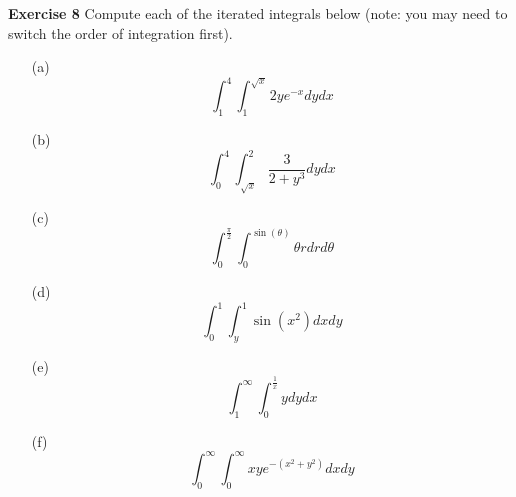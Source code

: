 \documentclass[12pt,oneside]{exam}
\newenvironment{exercise}[1]{\vspace{.1in}\noindent\textbf{Exercise #1 \hspace{.05em}}}{}
\begin{document}
\begin{exercise}{8}
Compute each of the iterated integrals below (note: you may need to switch the order of integration first). 
\begin{itemize}
\item[(a)] 
\begin{equation*}
\int_{1}^{4} \int_{1}^{\sqrt{x}} 2ye^{-x} dy dx
\end{equation*}
\item[(b)] 
\begin{equation*}
\int_{0}^{4} \int_{\sqrt{x}}^{2} \frac{3}{2+y^3}dy dx 
\end{equation*}
\item[(c)] 
\begin{equation*}
\int_{0}^{\frac{\pi}{2}} \int_{0}^{\sin(\theta)} \theta r dr d\theta
\end{equation*}
\item[(d)] 
\begin{equation*}
\int_{0}^{1} \int_{y}^{1} \sin(x^2) dx dy
\end{equation*}
\item[(e)] 
\begin{equation*}
\int_{1}^{\infty} \int_{0}^{\frac{1}{x}} y dy dx
\end{equation*}
\item[(f)] 
\begin{equation*}
\int_{0}^{\infty} \int_{0}^{\infty} xye^{-(x^2+y^2)} dx dy
\end{equation*}
\end{itemize}
\end{exercise}
\end{document}
